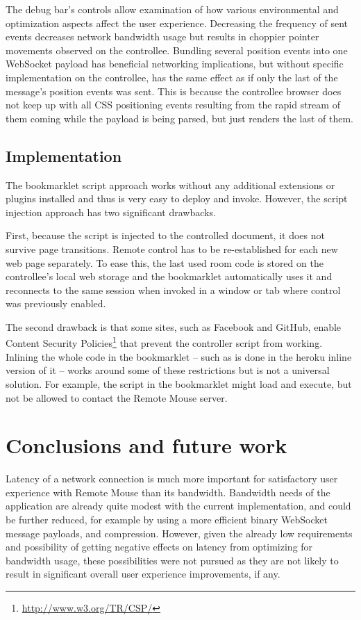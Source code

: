 \documentclass[a4paper,english,twocolumn,9pt]{extarticle}
\begin{document}
The debug bar's controls allow examination of how various
environmental and optimization aspects affect the user
experience. Decreasing the frequency of sent events decreases network
bandwidth usage but results in choppier pointer movements observed on
the controllee. Bundling several position events into one WebSocket
payload has beneficial networking implications, but without specific
implementation on the controllee, has the same effect as if only the
last of the message's position events was sent. This is because the
controllee browser does not keep up with all CSS positioning events
resulting from the rapid stream of them coming while the payload is
being parsed, but just renders the last of them.

\subsection*{Implementation}

The bookmarklet script approach works without any additional
extensions or plugins installed and thus is very easy to deploy and
invoke. However, the script injection approach has two significant
drawbacks.

First, because the script is injected to the controlled document, it
does not survive page transitions. Remote control has to be
re-established for each new web page separately. To ease this, the
last used room code is stored on the controllee's local web storage
and the bookmarklet automatically uses it and reconnects to the same
session when invoked in a window or tab where control was previously
enabled.

The second drawback is that some sites, such as Facebook and GitHub,
enable Content Security
Policies\footnote{\url{http://www.w3.org/TR/CSP/}} that prevent the
controller script from working. Inlining the whole code in the
bookmarklet -- such as is done in the heroku inline version of it --
works around some of these restrictions but is not a universal
solution. For example, the script in the bookmarklet might load and
execute, but not be allowed to contact the Remote Mouse server.

\section{Conclusions and future work}

Latency of a network connection is much more important for
satisfactory user experience with Remote Mouse than its
bandwidth. Bandwidth needs of the application are already quite modest
with the current implementation, and could be further reduced, for
example by using a more efficient binary WebSocket message payloads,
and compression. However, given the already low requirements and
possibility of getting negative effects on latency from optimizing for
bandwidth usage, these possibilities were not pursued as they are not
likely to result in significant overall user experience improvements,
if any.
\end{document}

